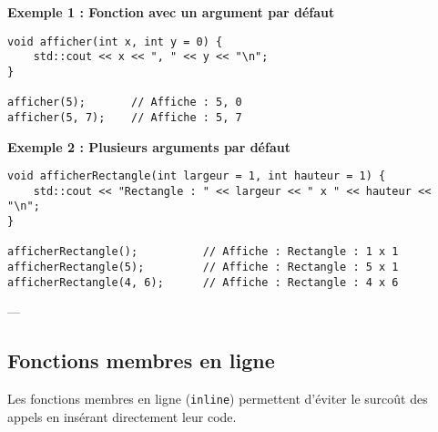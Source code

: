 \textbf{Exemple 1 : Fonction avec un argument par défaut}
\begin{tcolorbox}[colframe=blue!50!black, colback=blue!5!white, title=Exemple d'Attributs et Méthodes Statistiques, float=htb]
\begin{verbatim}
void afficher(int x, int y = 0) {
    std::cout << x << ", " << y << "\n";
}

afficher(5);       // Affiche : 5, 0
afficher(5, 7);    // Affiche : 5, 7
\end{verbatim}
\end{tcolorbox}
\textbf{Exemple 2 : Plusieurs arguments par défaut}
\begin{tcolorbox}[colframe=blue!50!black, colback=blue!5!white, title=Exemple d'Attributs et Méthodes Statistiques, float=htb]
\begin{verbatim}
void afficherRectangle(int largeur = 1, int hauteur = 1) {
    std::cout << "Rectangle : " << largeur << " x " << hauteur << "\n";
}

afficherRectangle();          // Affiche : Rectangle : 1 x 1
afficherRectangle(5);         // Affiche : Rectangle : 5 x 1
afficherRectangle(4, 6);      // Affiche : Rectangle : 4 x 6
\end{verbatim}
\end{tcolorbox}
---

\subsection{ Fonctions membres en ligne}
Les fonctions membres en ligne (\texttt{inline}) permettent d'éviter le surcoût des appels en insérant directement leur code.

